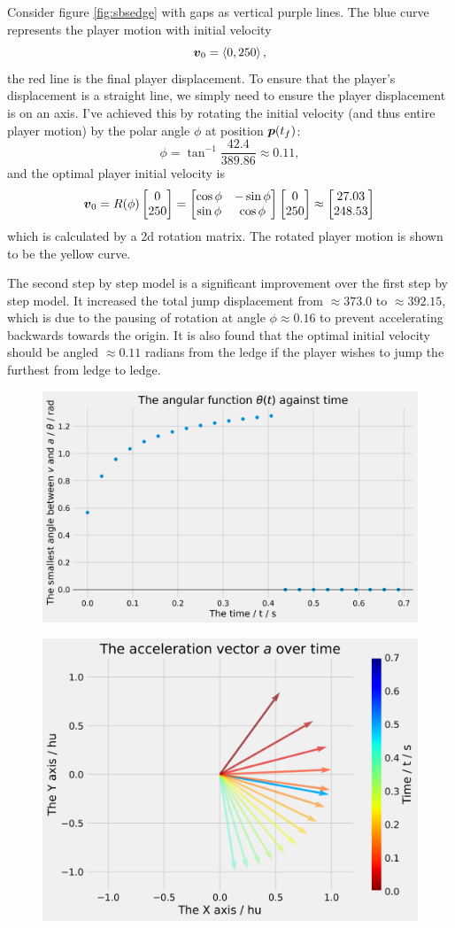 Consider figure \ref{fig:sbsedge} with gaps as vertical purple lines. The blue curve represents the player motion with initial velocity
\[
    \boldsymbol{v}_0 = \left\langle 0, 250 \right\rangle,
\]
the red line is the final player displacement. To ensure that the player's displacement is a straight line, we simply need to ensure the player displacement is on an axis. I've achieved this by rotating the initial velocity (and thus entire player motion) by the polar angle $\phi$ at position $\boldsymbol{p}({t_f})$:
\[
    \phi = \tan^{-1} \frac{42.4}{389.86} \approx 0.11,
\]
and the optimal player initial velocity is
\[
    \boldsymbol{v}_0 = R(\phi)\begin{bmatrix}0\\250 \end{bmatrix} = \begin{bmatrix}
        \cos \phi & -\sin \phi \\
        \sin \phi & \cos \phi
    \end{bmatrix}\begin{bmatrix}0\\250 \end{bmatrix} \approx \begin{bmatrix}27.03\\248.53 \end{bmatrix}
\]
which is calculated by a 2d rotation matrix. The rotated player motion is shown to be the yellow curve.

The second step by step model is a significant improvement over the first step by step model. It increased the total jump displacement from $\approx 373.0$ to $\approx 392.15$, which is due to the pausing of rotation at angle $\phi \approx 0.16$ to prevent accelerating backwards towards the origin. It is also found that the optimal initial velocity should be angled $\approx 0.11$ radians from the ledge if the player wishes to jump the furthest from ledge to ledge.

\begin{figure}[H]
    \centering
    \includegraphics[width=0.7\linewidth]{assets/step_by_step_acc.png}
        \caption{}
        \label{fig:sbsa}
\end{figure}

\begin{figure}[H]
    \centering
   \includegraphics[width=0.7\linewidth]{assets/step_by_step_acc_v.png}
        \caption{}
        \label{fig:sbsav}
\end{figure}

